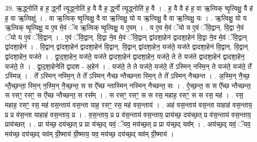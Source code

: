 \documentclass[17pt]{extarticle}
\begin{document}
39. ऋ॒द्ध्नोति॑ ह ह॒ र्द्ध्नो त्यृ॒द्ध्नोति॑ ह॒ वै वै ह॒ र्द्ध्नो त्यृ॒द्ध्नोति॑ ह॒ वै । . ह॒ वै वै ह॑ ह॒ वा ऋ॒त्विक् ष्वृ॒त्विक्षु॒ वै ह॑ ह॒ वा ऋ॒त्विक्षु॑ । . वा ऋ॒त्विक् ष्वृ॒त्विक्षु॒ वै वा ऋ॒त्विक्षु॒ यो य ऋ॒त्विक्षु॒ वै वा ऋ॒त्विक्षु॒ यः । . ऋ॒त्विक्षु॒ यो य ऋ॒त्विक् ष्वृ॒त्विक्षु॒ य ए॒व मे॒वं ॅय ऋ॒त्विक् ष्वृ॒त्विक्षु॒ य ए॒वम् । . य ए॒व मे॒वं ॅयो य ए॒वं ॅवि॒द्वान्. वि॒द्वा ने॒वं ॅयो य ए॒वं ॅवि॒द्वान् । . ए॒वं ॅवि॒द्वान्. वि॒द्वा ने॒व मे॒वं ॅवि॒द्वान् द्वा॑दशा॒हेन॑ द्वादशा॒हेन॑ वि॒द्वा ने॒व मे॒वं ॅवि॒द्वान् द्वा॑दशा॒हेन॑ । . वि॒द्वान् द्वा॑दशा॒हेन॑ द्वादशा॒हेन॑ वि॒द्वान्. वि॒द्वान् द्वा॑दशा॒हेन॒ यज॑ते॒ यज॑ते द्वादशा॒हेन॑ वि॒द्वान्. वि॒द्वान् द्वा॑दशा॒हेन॒ यज॑ते । . द्वा॒द॒शा॒हेन॒ यज॑ते॒ यज॑ते द्वादशा॒हेन॑ द्वादशा॒हेन॒ यज॑ते॒ ते ते यज॑ते द्वादशा॒हेन॑ द्वादशा॒हेन॒ यज॑ते॒ ते । . द्वा॒द॒शा॒हेनेति॑ द्वादश - अ॒हेन॑ । . यज॑ते॒ ते ते यज॑ते॒ यज॑ते॒ ते᳚ ऽस्मिन् नस्मि॒न् ते यज॑ते॒ यज॑ते॒ ते᳚ ऽस्मिन्न् । . ते᳚ ऽस्मिन् नस्मि॒न् ते ते᳚ ऽस्मिन् नैच्छ न्तैच्छन्ता स्मि॒न् ते ते᳚ ऽस्मिन् नैच्छन्त । . अ॒स्मि॒न् नै॒च्छ॒ न्तै॒च्छ॒न्ता॒ स्मि॒न् न॒स्मि॒न् नै॒च्छ॒न्त॒ स स ऐ᳚च्छ न्तास्मिन् नस्मिन् नैच्छन्त॒ सः । . ऐ॒च्छ॒न्त॒ स स ऐ᳚च्छ न्तैच्छन्त॒ स रसꣳ॒॒ रसꣳ॒॒ स ऐ᳚च्छ न्तैच्छन्त॒ स रस᳚म् । . स रसꣳ॒॒ रसꣳ॒॒ स स रस॒ महाह॒ रसꣳ॒॒ स स रस॒ मह॑ । . रस॒ महाह॒ रसꣳ॒॒ रस॒ मह॑ वस॒न्ताय॑ वस॒न्ता याह॒ रसꣳ॒॒ रस॒ मह॑ वस॒न्ताय॑ । . अह॑ वस॒न्ताय॑ वस॒न्ता याहाह॑ वस॒न्ताय॒ प्र प्र व॑स॒न्ता याहाह॑ वस॒न्ताय॒ प्र । . व॒स॒न्ताय॒ प्र प्र व॑स॒न्ताय॑ वस॒न्ताय॒ प्राय॑च्छ॒ दय॑च्छ॒त् प्र व॑स॒न्ताय॑ वस॒न्ताय॒ प्राय॑च्छत् । . प्रा य॑च्छ॒ दय॑च्छ॒त् प्र प्रा य॑च्छ॒द् यवं॒ ॅयव॒ मय॑च्छ॒त् प्र प्रा य॑च्छ॒द् यव᳚म् । . अय॑च्छ॒द् यवं॒ ॅयव॒ मय॑च्छ॒ दय॑च्छ॒द् यव॑म् ग्री॒ष्माय॑ ग्री॒ष्माय॒ यव॒ मय॑च्छ॒ दय॑च्छ॒द् यव॑म् ग्री॒ष्माय॑ । \newline
\pagebreak
{}
\end{document}
